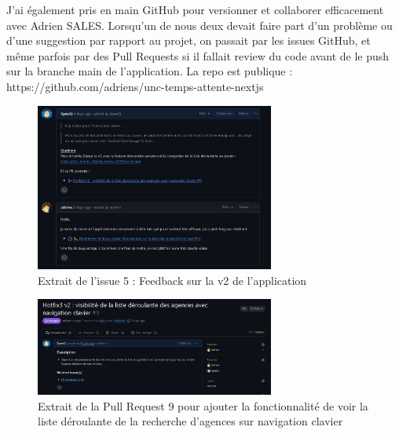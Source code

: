 \documentclass[12pt,a4paper]{report}
\begin{document}
\vspace{1cm}
J’ai également pris en main GitHub pour versionner et collaborer efficacement avec Adrien SALES. Lorsqu'un de nous deux devait faire part d'un problème ou d'une suggestion par rapport au projet, on passait par les issues GitHub, et même parfois par des Pull Requests si il fallait review du code avant de le push sur la branche main de l'application. La repo est publique : https://github.com/adriens/unc-temps-attente-nextjs

\vspace{1cm}
\begin{figure}[h] %
    \centering
    \includegraphics[width=0.7\textwidth]{ressources_rapport/extrait_issue_5.JPG}
    \caption{Extrait de l'issue 5 : Feedback sur la v2 de l'application}
    \label{fig:exemple}
\end{figure}

\begin{figure}[h] %
    \centering
    \includegraphics[width=0.7\textwidth]{ressources_rapport/extrait_pr_9.JPG}
    \caption{Extrait de la Pull Request 9 pour ajouter la fonctionnalité de voir la liste déroulante de la recherche d'agences sur navigation clavier}
    \label{fig:exemple}
\end{figure}
\newpage
\end{document}
